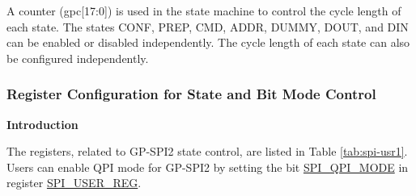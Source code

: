 \documentclass[main\_\_EN.tex]{subfiles}
\begin{document}
A counter (gpc[17:0]) is used in the state machine to control the cycle length of each state. The states CONF, PREP, CMD, ADDR, DUMMY, DOUT, and DIN can be enabled or disabled independently. The cycle length of each state can also be configured independently. 

\subsubsection{Register Configuration for State and Bit Mode Control} \label{sec:gp-spi2-state-and-register-configuration}

\textbf{Introduction}

The registers, related to GP-SPI2 state control, are listed in Table \ref{tab:spi-usr1}. Users can enable QPI mode for GP-SPI2 by setting the bit \hyperref[fielddesc:SPIQPIMODE]{SPI\_QPI\_MODE} in register \hyperref[regdesc:SPIUSERREG]{SPI\_USER\_REG}. 
\end{document}
